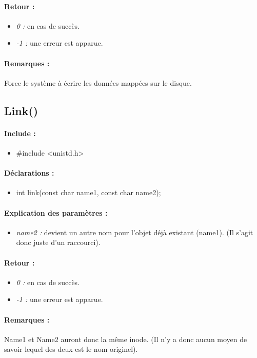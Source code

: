 \documentclass{article}[12pt]
\begin{document}
\paragraph{Retour : }
\begin{itemize}
	\item \emph{0 : } en cas de succès.
	\item \emph{-1 : } une erreur est apparue.
\end{itemize}
\paragraph{Remarques : }
Force le système à écrire les données mappées sur le disque.
\subsection{Link()}
\paragraph{Include : }
\begin{itemize}
	\item \#include <unistd.h>
\end{itemize}
\paragraph{Déclarations : }
\begin{itemize}
	\item int link(const char \* name1, const char \* name2);
\end{itemize}
\paragraph{Explication des paramètres : }
\begin{itemize}
	\item \emph{name2 : } devient un autre nom pour l'objet déjà existant (name1). (Il s'agit donc juste d'un raccourci).
\end{itemize}
\paragraph{Retour : }
\begin{itemize}
	\item \emph{0 : } en cas de succès.
	\item \emph{-1 : } une erreur est apparue.
\end{itemize}
\paragraph{Remarques : }
Name1 et Name2 auront donc la même inode. (Il n'y a donc aucun moyen de savoir lequel des deux est le nom originel).
\end{document}
